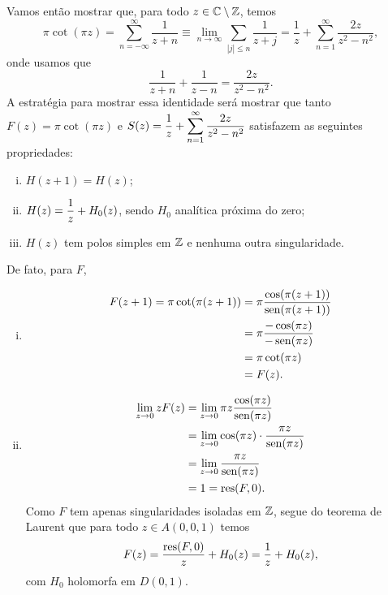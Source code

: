 \begin{exemplo}
        Vamos então mostrar que, para todo $z\in\mathbb{C}\setminus\mathbb{Z}$, temos
        \begin{equation*}
            \pi\cot(\pi z) = \sum_{n=-\infty}^{\infty} \frac{1}{z+n}
                           \equiv \lim_{n\to\infty} \sum_{|j|\leq n} \frac{1}{z+j}
                           = \frac{1}{z} + \sum_{n=1}^{\infty} \frac{2z}{z^2 - n^2},
        \end{equation*}
        onde usamos que
        \begin{equation*}
            \frac{1}{z+n} + \frac{1}{z-n} = \frac{2z}{z^2 - n^2}.
        \end{equation*}
        A estratégia para mostrar essa identidade será mostrar que tanto
        $F(z) = \pi\cot(\pi z)$ e $S(z) = \displaystyle{\frac{1}{z} + 
        \sum_{n=1}^{\infty} \frac{2z}{z^2- n^2}}$ satisfazem as seguintes propriedades:
        \begin{enumerate}[(i)]
            \item $H(z+1) = H(z)$;
            \item $H(z) = \displaystyle{ \frac{1}{z} + H_0(z) }$, sendo $H_0$ analítica próxima
            do zero;
            \item $H(z)$ tem polos simples em $\mathbb{Z}$ e nenhuma outra singularidade.
        \end{enumerate}
        De fato, para $F$,
        \begin{enumerate}[(i)]
            \item 
            \begin{align*}
                F(z+1)=\pi\cot(\pi(z+1)) &= \pi\frac{\cos(\pi(z+1))}{\operatorname{sen}(\pi(z+1))} \\
                                         &= \pi\frac{-\cos(\pi z)}{-\operatorname{sen}(\pi z)} \\
                                         &= \pi\cot(\pi z) \\
                                         &= F(z).
            \end{align*}
            \item 
            \begin{align*}
                \lim_{z\to 0} zF(z) &= \lim_{z\to 0} \pi z 
                \frac{\cos(\pi z)}{\operatorname{sen}(\pi z)} \\
                &= \lim_{z\to 0} \cos(\pi z)\cdot\frac{\pi z}{\operatorname{sen}(\pi z)} \\
                &= \lim_{z\to 0} \frac{\pi z}{\operatorname{sen}(\pi z)} \\
                &= 1 = \operatorname{res}(F,0).
            \end{align*}
            Como $F$ tem apenas singularidades isoladas em $\mathbb{Z}$, segue do
            teorema de Laurent que para todo $z\in A(0,0,1)$ temos
            \begin{equation*}
                F(z) = \frac{\operatorname{res}(F,0)}{z} + H_0(z) = \frac{1}{z} + H_0(z),
            \end{equation*}
            com $H_0$ holomorfa em $D(0,1).$
            

\end{enumerate}
\end{exemplo}
